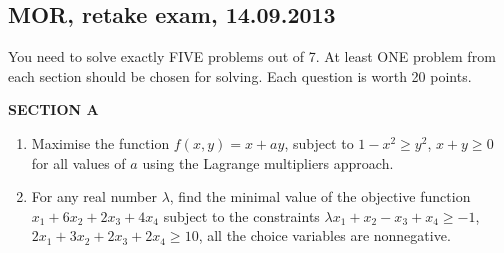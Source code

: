 \documentclass[12pt]{article} %
\theoremstyle{definition} %
\begin{document}

\subsection{MOR, retake exam, 14.09.2013}


You need to solve exactly FIVE problems out of 7. At least ONE problem from each section should be chosen for solving. Each question is worth 20 points.

\vspace{20pt}
\textbf{SECTION A}
\vspace{20pt}

\begin{enumerate}
\item Maximise the function $f(x,y)=x+ay$, subject to $1-x^2\geq y^2$, $x+y \geq 0$ for all values of $a$ using the Lagrange multipliers approach.

\item For any real number $\lambda$, find the minimal value of the objective function $x_1+6x_2+2x_3+4x_4$ subject to the constraints  $\lambda x_1+x_2-x_3+x_4\geq -1$, $2x_1+3x_2+2x_3+2x_4 \geq 10$,  all the choice variables are nonnegative.
\end{enumerate}
\end{document}

